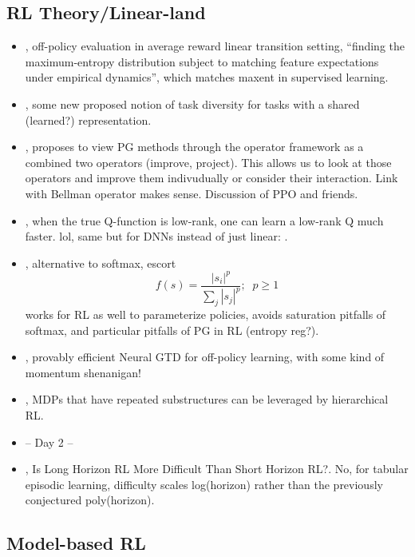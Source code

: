 \subsection{RL Theory/Linear-land}
\begin{itemize}
\item \citet{lazic2020maximum}, off-policy evaluation in average reward linear transition setting, ``finding the maximum-entropy distribution subject to matching feature expectations under empirical dynamics'', which matches maxent in supervised learning.
\item \citet{tripuraneni2020theory}, some new proposed notion of task diversity for tasks with a shared (learned?) representation.
\item \citet{ghosh2020operator}, proposes to view PG methods through the operator framework as a combined two operators (improve, project). This allows us to look at those operators and improve them indivudually or consider their interaction. Link with Bellman operator makes sense. Discussion of PPO and friends.
\item \citet{shah2020sample}, when the true Q-function is low-rank, one can learn a low-rank Q much faster. lol, same but for DNNs instead of just linear: \citet{agarwal2020flambe}.
\item \citet{mei2020escaping}, alternative to softmax, escort
  $$f(s) = \frac{|s_i|^p}{\sum_j |s_j|^p}; \;\; p\geq 1$$
  works for RL as well to parameterize policies, avoids saturation pitfalls of softmax, and particular pitfalls of PG in RL (entropy reg?).
\item \citet{wai2020provably}, provably efficient Neural GTD for off-policy learning, with some kind of momentum shenanigan!
\item \citet{wen2020efficiency}, MDPs that have repeated substructures can be leveraged by hierarchical RL.
\item -- Day 2 --
\item \citet{wang2020long}, Is Long Horizon RL More Difficult Than Short Horizon RL?. No, for tabular episodic learning, difficulty scales log(horizon) rather than the previously conjectured poly(horizon).
  
\end{itemize}

\subsection{Model-based RL}

